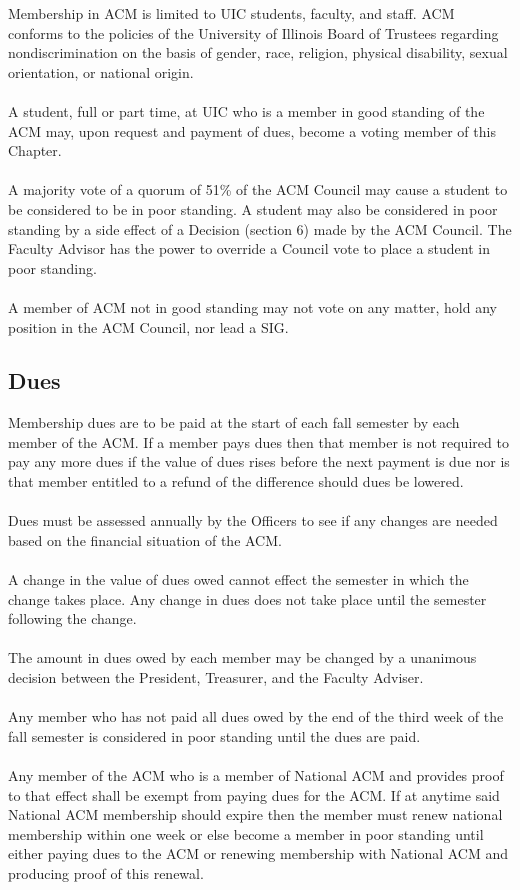 \documentclass[12pt,titlepage]{article}
\begin{document}
Membership in ACM is limited to UIC students, faculty, and staff. ACM conforms to the policies of the University of Illinois Board of Trustees regarding nondiscrimination on the basis of gender, race, religion, physical disability, sexual orientation, or national origin.\\
\\
A student, full or part time, at UIC who is a member in good standing of the ACM may, upon request and payment of dues, become a voting member of this Chapter.\\
\\
A majority vote of a quorum of 51\% of the ACM Council may cause a student to be considered to be in poor standing. A student may also be considered in poor standing by a side effect of a Decision (section 6) made by the ACM Council. The Faculty Advisor has the power to override a Council vote to place a student in poor standing.\\
\\
A member of ACM not in good standing may not vote on any matter, hold any position in the ACM Council, nor lead a SIG.

\subsection{Dues}

Membership dues are to be paid at the start of each fall semester by each member of the ACM. If a member pays dues then that member is not required to pay any more dues if the value of dues rises before the next payment is due nor is that member entitled to a refund of the difference should dues be lowered.\\
\\
Dues must be assessed annually by the Officers to see if any changes are needed based on the financial situation of the ACM.\\
\\
A change in the value of dues owed cannot effect the semester in which the change takes place. Any change in dues does not take place until the semester following the change.\\
\\
The amount in dues owed by each member may be changed by a unanimous decision between the President, Treasurer, and the Faculty Adviser.\\
\\
Any member who has not paid all dues owed by the end of the third week of the fall semester is considered in poor standing until the dues are paid.\\
\\
Any member of the ACM who is a member of National ACM and provides proof to that effect shall be exempt from paying dues for the ACM. If at anytime said National ACM membership should expire then the member must renew national membership within one week or else become a member in poor standing until either paying dues to the ACM or renewing membership with National ACM and producing proof of this renewal.
\end{document}
